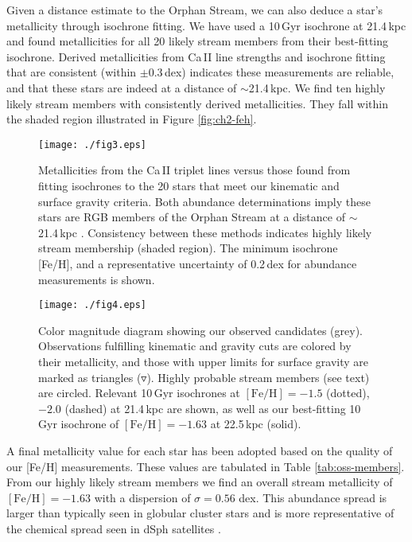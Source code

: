 Given a distance estimate to the Orphan Stream, we can also deduce a star's metallicity through isochrone fitting. We have used a 10\,Gyr \citet{Girardi_et-al_2008} isochrone at 21.4\,kpc \citep{Newberg_et-al_2010} and found metallicities for all 20 likely stream members from their best-fitting isochrone. Derived metallicities from Ca\,\textsc{II} line strengths and isochrone fitting that are consistent (within $\pm0.3$\,dex) indicates these measurements are reliable, and that these stars are indeed at a distance of $\sim$21.4\,kpc. We find ten highly likely stream members with consistently derived metallicities. They fall within the shaded region illustrated in Figure \ref{fig:ch2-feh}. 

\begin{figure}[t!]
	\texttt{[image: ./fig3.eps]}
	\caption{Metallicities from the Ca\,\textsc{II} triplet lines versus those found from fitting isochrones to the 20 stars that meet our kinematic and surface gravity criteria. Both abundance determinations imply these stars are RGB members of the Orphan Stream at a distance of $\sim$21.4\,kpc \citep{Newberg_et-al_2010}. Consistency between these methods indicates highly likely stream membership (shaded region). The minimum isochrone [Fe/H], and a representative uncertainty of 0.2\,dex for abundance measurements is shown.}
	\label{fig:feh}
\end{figure}

\begin{figure}[t!]
	\texttt{[image: ./fig4.eps]}
	\caption{Color magnitude diagram showing our observed candidates (grey). Observations fulfilling kinematic and gravity cuts are colored by their metallicity, and those with upper limits for surface gravity are marked as triangles ($\triangledown$). Highly probable stream members (see text) are circled. Relevant 10\,Gyr \citet{Girardi_et-al_2008} isochrones at $[\mbox{Fe/H}] = -1.5$ (dotted), $-2.0$ (dashed) at 21.4\,kpc \citep{Newberg_et-al_2010} are shown, as well as our best-fitting 10\,Gyr isochrone of $[\mbox{Fe/H}] = -1.63$ at 22.5\,kpc (solid).}
	\label{fig:cmd}
\end{figure}

A final metallicity value for each star has been adopted based on the quality of our [Fe/H] measurements. These values are tabulated in Table \ref{tab:oss-members}. From our highly likely stream members we find an overall stream metallicity of $[\mbox{Fe/H}] = -1.63$ with a dispersion of $\sigma = 0.56$ dex. This abundance spread is larger than typically seen in globular cluster stars and is more representative of the chemical spread seen in dSph satellites \citep[e.g.,][]{Frebel_Norris_2011}.



